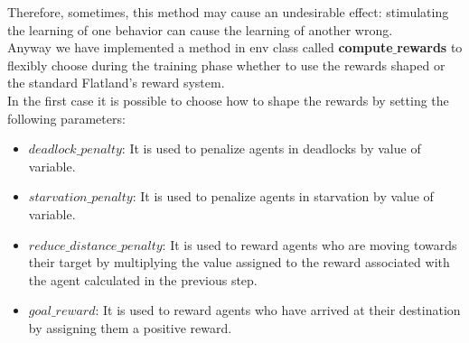 Therefore, sometimes, this method may cause an undesirable effect: stimulating the learning of one behavior can cause the learning of another wrong. \\
Anyway we have implemented a method in env class called \textbf{compute$\_$rewards} to flexibly choose during the training phase whether to use the rewards shaped or the standard Flatland's reward system. \\
In the first case it is possible to choose how to shape the rewards by setting the following parameters:
\begin{itemize}
	\item\textbf{$deadlock\_penalty$}: It is used to penalize agents in deadlocks by value of variable.
	\item \textbf{$starvation\_penalty$}: It is used to penalize agents in starvation by value of variable.
	\item \textbf{$reduce\_distance\_penalty$}: It is used to reward agents who are moving towards their target by multiplying the value assigned to the reward associated with the agent calculated in the previous step.
	\item \textbf{$goal\_reward$}: It is used to reward agents who have arrived at their destination by assigning them a positive reward.
\end{itemize}